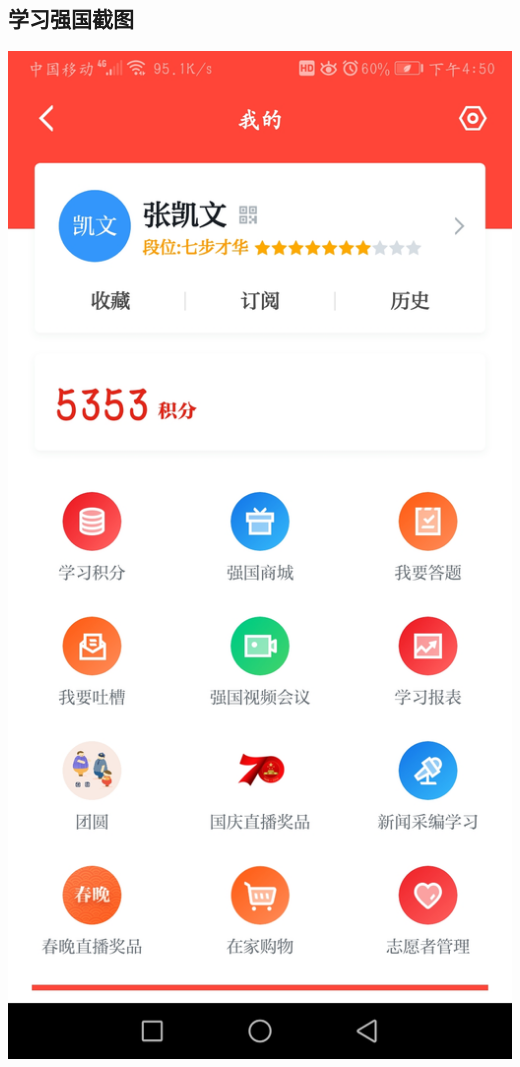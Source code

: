 \documentclass{article}
\begin{document}
\subsection{学习强国截图}
\begin{center}
	\includegraphics[scale=0.1]{xuexiqiangguo}
\end{center}

\hspace*{\fill} \\



\end{document}
